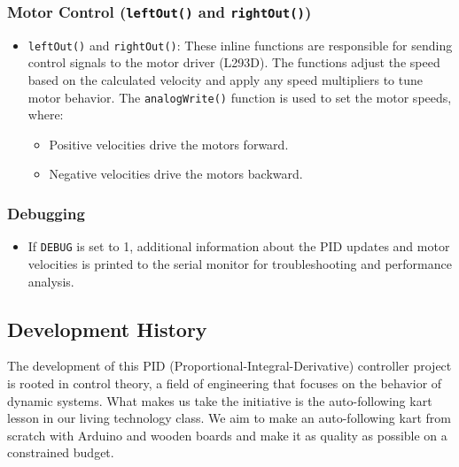 \documentclass[a4paper,12pt]{article}
\begin{document}
\begin{lstlising}[language=C++]
\begin{lstlising}[language=C++]
\subsubsection{Motor Control (\texttt{leftOut()} and \texttt{rightOut()})}
\begin{itemize}
\item \texttt{leftOut()} and \texttt{rightOut()}: These inline functions are responsible for sending control signals to the motor driver (L293D). The functions adjust the speed based on the calculated velocity and apply any speed multipliers to tune motor behavior. The \texttt{analogWrite()} function is used to set the motor speeds, where:
\begin{itemize}
\item Positive velocities drive the motors forward.
\item Negative velocities drive the motors backward.
\end{itemize}
\end{itemize}
\subsubsection{Debugging}
\begin{itemize}
\item If \texttt{DEBUG} is set to 1, additional information about the PID updates and motor velocities is printed to the serial monitor for troubleshooting and performance analysis.
\end{itemize}
\subsection{Development History}
The development of this PID (Proportional-Integral-Derivative) controller project is rooted in control theory, a field of engineering that focuses on the behavior of dynamic systems. What makes us take the initiative is the auto-following kart lesson in our living technology class. We aim to make an auto-following kart from scratch with Arduino and wooden boards and make it as quality as possible on a constrained budget.

\end{lstlising}
\end{lstlising}
\end{document}
